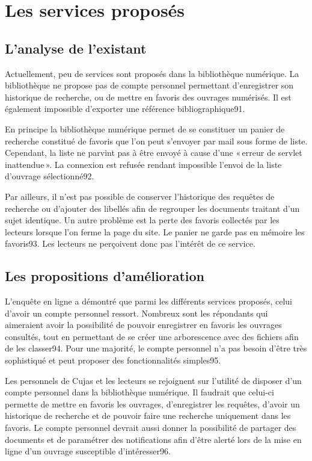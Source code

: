 \section{Les services proposés}

\subsection{L’analyse de l’existant}

Actuellement, peu de services sont proposés dans la bibliothèque numérique. La bibliothèque ne propose pas de compte personnel permettant d’enregistrer son historique de recherche, ou de mettre en favoris des ouvrages numérisés. Il est également impossible d’exporter une référence bibliographique91. 

En principe la bibliothèque numérique permet de se constituer un panier de recherche constitué de favoris que l’on peut s’envoyer par mail sous forme de liste. Cependant, la liste ne parvint pas à être envoyé à cause d’une « erreur de servlet inattendue ». La connexion est refusée rendant impossible l’envoi de la liste d’ouvrage sélectionné92.  

Par ailleurs, il n’est pas possible de conserver l’historique des requêtes de recherche ou d’ajouter des libellés afin de regrouper les documents traitant d’un sujet identique. Un autre problème est la perte des favoris collectés par les lecteurs lorsque l’on ferme la page du site. Le panier ne garde pas en mémoire les favoris93. Les lecteurs ne perçoivent donc pas l’intérêt de ce service.  

\subsection{Les propositions d’amélioration}

L’enquête en ligne a démontré que parmi les différents services proposés, celui d’avoir un compte personnel ressort. Nombreux sont les répondants qui aimeraient avoir la possibilité de pouvoir enregistrer en favoris les ouvrages consultés, tout en permettant de se créer une arborescence avec des fichiers afin de les classer94. Pour une majorité, le compte personnel n’a pas besoin d’être très sophistiqué et peut proposer des fonctionnalités simples95.  

Les personnels de Cujas et les lecteurs se rejoignent sur l’utilité de disposer d’un compte personnel dans la bibliothèque numérique. Il faudrait que celui-ci permette de mettre en favoris les ouvrages, d’enregistrer les requêtes, d’avoir un historique de recherche et de pouvoir faire  une recherche uniquement dans les favoris. Le compte personnel devrait aussi donner la possibilité de partager des documents et de paramétrer des notifications afin d’être alerté lors de la mise en ligne d’un ouvrage susceptible d’intéresser96.  

